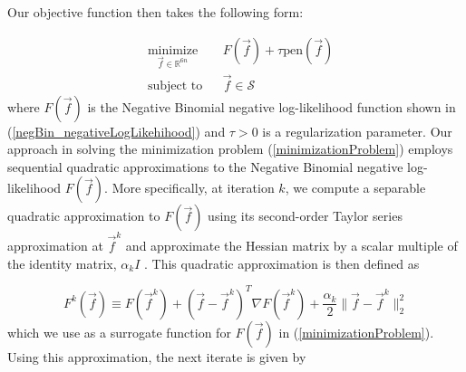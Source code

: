 \documentclass{article}
\def\R{\mathbb{R}} %
\begin{document}
\noindent Our objective function then takes the following form:

\begin{equation} \label{minimizationProblem}
	\begin{aligned}
		& \underset{\vec{f} \in \R^{6n}}{\text{minimize}}
		& & F(\vec{f}) + \tau \text{pen}(\vec{f}) \\
		& \text{subject to}
		& & \vec{f} \in \mathcal{S}
	\end{aligned}
\end{equation}
where $F(\vec{f})$ is the Negative Binomial negative log-likelihood function shown in (\ref{negBin_negativeLogLikehihood}) and $\tau > 0 $ is a regularization parameter. Our approach in solving the minimization problem (\ref{minimizationProblem}) employs sequential quadratic approximations to the Negative Binomial negative log-likelihood $F(\vec{f})$. More specifically, at iteration $k$, we compute a separable quadratic approximation to $F(\vec{f})$ using its second-order Taylor series approximation at $\vec{f}^k$ and approximate the Hessian matrix by a scalar multiple of the identity matrix, $\alpha_k I$ \cite{Marcia_SPIRALTAP}. This quadratic approximation is then defined as

\begin{equation*}
	F^k (\vec{f}) \equiv F(\vec{f}^k) + (\vec{f} - \vec{f}^k)^T \nabla F(\vec{f}^k) + \frac{\alpha_k}{2} \|\vec{f} - \vec{f}^k\|_2^2
\end{equation*}
which we use as a surrogate function for $F(\vec{f})$ in (\ref{minimizationProblem}). Using this approximation, the next iterate is given by 
\end{document}
